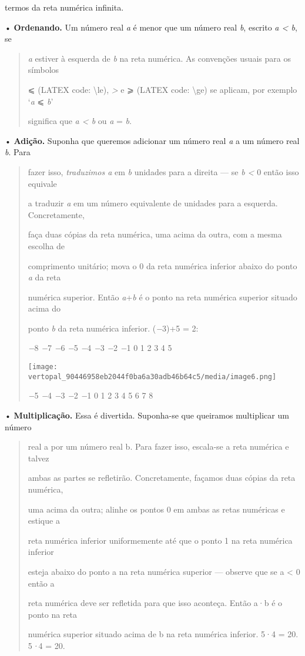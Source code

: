\documentclass[
]{article}
\begin{document}
termos da reta numérica infinita.

• \textbf{Ordenando.} Um número real \emph{a} é menor que um número real
\emph{b}, escrito \emph{a \textless{} b}, se

\begin{quote}
\emph{a} estiver à esquerda de \emph{b} na reta numérica. As convenções
usuais para os símbolos

⩽ (LATEX code: \textbackslash le), \emph{\textgreater{}} e ⩾ (LATEX
code: \textbackslash ge) se aplicam, por exemplo `\emph{a} ⩽ \emph{b}'

significa que \emph{a \textless{} b} ou \emph{a} = \emph{b}.
\end{quote}

• \textbf{Adição.} Suponha que queremos adicionar um número real
\emph{a} a um número real \emph{b}. Para

\begin{quote}
fazer isso, \emph{traduzimos a} em \emph{b} unidades para a direita ---
se \emph{b \textless{}} 0 então isso equivale

a traduzir \emph{a} em um número equivalente de unidades para a
esquerda. Concretamente,

faça duas cópias da reta numérica, uma acima da outra, com a mesma
escolha de

comprimento unitário; mova o 0 da reta numérica inferior abaixo do ponto
\emph{a} da reta

numérica superior. Então \emph{a}+\emph{b} é o ponto na reta numérica
superior situado acima do

ponto \emph{b} da reta numérica inferior. (\emph{−}3)+5 = 2:

\emph{−}8 \emph{−}7 \emph{−}6 \emph{−}5 \emph{−}4 \emph{−}3 \emph{−}2
\emph{−}1 0 1 2 3 4 5

\texttt{[image: vertopal\_90446958eb2044f0ba6a30adb46b64c5/media/image6.png]}

\emph{−}5 \emph{−}4 \emph{−}3 \emph{−}2 \emph{−}1 0 1 2 3 4 5 6 7 8
\end{quote}

• \textbf{Multiplicação.} Essa é divertida. Suponha-se que queiramos
multiplicar um número

\begin{quote}
real a por um número real b. Para fazer isso, escala-se a reta numérica
e talvez

ambas as partes se refletirão. Concretamente, façamos duas cópias da
reta numérica,

uma acima da outra; alinhe os pontos 0 em ambas as retas numéricas e
estique a

reta numérica inferior uniformemente até que o ponto 1 na reta numérica
inferior

esteja abaixo do ponto a na reta numérica superior --- observe que se a
\textless{} 0 então a

reta numérica deve ser refletida para que isso aconteça. Então a·b é o
ponto na reta

numérica superior situado acima de b na reta numérica inferior. 5·4 =
20. 5\emph{·}4 = 20.
\end{quote}
\end{document}
